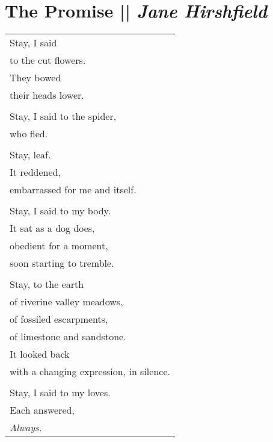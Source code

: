 
\section[The Promise]{The Promise || \emph{Jane Hirshfield} \hspace*{\fill}  \thepage}
\vspace*{-0.5cm}
\begin{center}
\begin{tabular}{l}
Stay, I said\\
to the cut flowers.\\
They bowed\\
their heads lower.\\
\\Stay, I said to the spider,\\
who fled.\\
\\Stay, leaf.\\
It reddened,\\
embarrassed for me and itself.\\
\\Stay, I said to my body.\\
It sat as a dog does,\\
obedient for a moment,\\
soon starting to tremble.\\
\\Stay, to the earth\\
of riverine valley meadows,\\
of fossiled escarpments,\\
of limestone and sandstone.\\
It looked back\\
with a changing expression, in silence.\\
\\Stay, I said to my loves.\\
Each answered,\\
\emph{Always.}
\end{tabular}
\end{center}